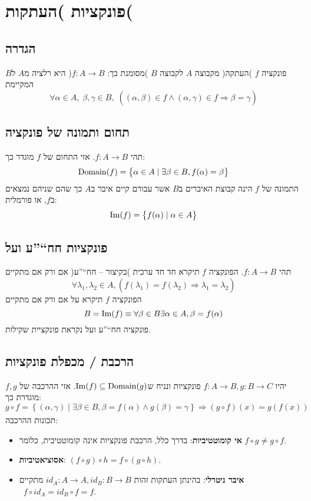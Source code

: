 \documentclass[11pt, oneside]{article}
\newcommand{\opr}[1]{\underset{\text{#1}}{\Rightarrow}}
\newcommand{\definition}[2]{\textbf{#1}: #2.}
\DeclarePairedDelimiter\parens{\lparen}{\rparen}
\DeclareMathOperator{\dnp}{Domain}
\newcommand{\domain}[1]{\dnp\parens*{#1}}
\DeclareMathOperator{\imnp}{Im}
\newcommand{\image}[1]{\imnp\parens*{#1}}
\begin{document}

\clearpage
\section*{פונקציות )העתקות(}
\subsection*{הגדרה}
פונקציה $f$ )העתקה( מקבוצה $A$ לקבוצה $B$ )מסומנת כך: $f: A \to B$( היא רלציה מ$A$ ל$B$ המקיימת 
\[
\forall \alpha \in A,\;\beta, \gamma \in B,\;((\alpha, \beta) \in f \land (\alpha, \gamma) \in f \opr{} \beta = \gamma)
\]

\subsection*{תחום ותמונה של פונקציה}
תהי $f: A \to B$. אזי התחום של $f$ מוגדר כך:
\[
\domain{f} = \left\{\alpha \in A \mid \exists \beta \in B, f(\alpha) = \beta\right\}
\]
התמונה של $f$ הינה קבוצת האיברים ב$B$ אשר עבורם קיים איבר ב$A$ כך שהם שניהם נמצאים ב$f$, או פורמלית:
\[
\image{f} = \left\{f(\alpha) \mid \alpha \in A\right\}
\]

\subsection*{פונקציות חח``''ע ועל}
תהי $f: A \to B$. הפונקציה $f$ תיקרא חד חד ערכית )בקיצור -- חח``''ע( אם ורק אם מתקיים
\[
\forall \lambda_{1}, \lambda_{2} \in A, (f(\lambda_{1}) = f(\lambda_{2}) \opr{} \lambda_{1} = \lambda_{2})
\]
הפונקציה $f$ תיקרא על אם ורק אם מתקיים
\[
B = \image{f} \equiv \forall \beta \in B \exists \alpha \in A, \beta = f(\alpha)
\]
פונקציה חח``''ע ועל נקראת פונקציית שקילות.

\subsection*{הרכבת / מכפלת פונקציות}
יהיו $f: A \to B, g: B \to C$ פונקציות ונניח ש$\image{f} \subseteq \domain{g}$. אזי ההרכבה של $f, g$ מוגדרת כך:
\[
g \circ f = \left\{(\alpha, \gamma) \mid \exists \beta \in B, \beta = f(\alpha) \land g(\beta) = \gamma\right\} \opr{} (g \circ f)(x) = g(f(x))
\]
תכונות ההרכבה:
\begin{itemize}
\item \definition{אי קומוטטיביות}{בדרך כלל, הרכבת פונקציות אינה קומוטטיבית, כלומר $f \circ g \neq g \circ f$}
\item \definition{אסוציאטיביות}{$(f \circ g) \circ h = f \circ (g \circ h)$}
\item \definition{איבר ניטרלי}{בהינתן העתקות זהות $id_{A}: A \to A, id_{B}: B \to B$ מתקיים\\\
$f \circ id_{A} = id_{B} \circ f = f$}
\end{itemize}
\end{document}
